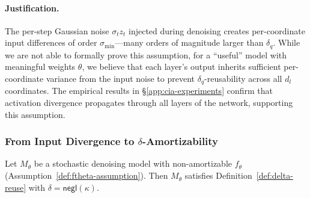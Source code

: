\paragraph{Justification.}
The per-step Gaussian noise $\sigma_t z_t$ injected during denoising creates per-coordinate input differences of order $\sigma_{\min}$---many orders of magnitude larger than $\delta_q$. While we are not able to formally prove this assumption, for a ``useful'' model with meaningful weights $\theta$, we believe that each layer's output inherits sufficient per-coordinate variance from the input noise to prevent $\delta_q$-reusability across all $d_l$ coordinates. The empirical results in \S\ref{app:cia-experiments} confirm that activation divergence propagates through all layers of the network, supporting this assumption.

\subsubsection{From Input Divergence to $\delta$-Amortizability}

\begin{theorem}
\label{thm:amort-diff}
Let $M_\theta$ be a stochastic denoising model with non-amortizable $f_\theta$ (Assumption~\ref{def:ftheta-assumption}). Then $M_\theta$ satisfies Definition~\ref{def:delta-reuse} with $\delta = \mathsf{negl}(\kappa)$.
\end{theorem}


